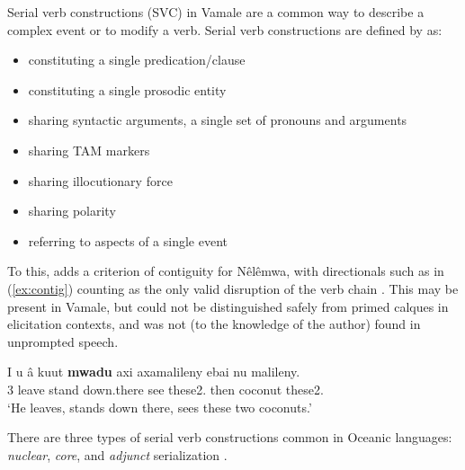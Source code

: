 
Serial verb constructions (SVC) in Vamale are a common way to describe a complex event or to modify a verb. Serial verb constructions are defined by \textcite[169]{bril_complex_2004} as:
\begin{itemize}
	\item constituting a single predication/clause
	\item constituting a single prosodic entity
	\item sharing syntactic arguments, a single set of pronouns and arguments
	\item sharing TAM markers
	\item sharing illocutionary force
	\item sharing polarity
	\item referring to aspects of a single event
\end{itemize}
To this, \citeauthor{bril_complex_2004} adds a criterion of contiguity for Nêlêmwa, with directionals such as in (\ref{ex:contig}) counting as the only valid disruption of the verb chain \parencite[169]{bril_complex_2004}. This may be present in Vamale, but could not be distinguished safely from primed calques in elicitation contexts, and was not (to the knowledge of the author) found in unprompted speech. %

\ea
\label{ex:contig}
\gll I u â kuut \textbf{mwadu} axi axamalileny ebai nu malileny.\\ 
 3  leave stand down.there see these2. then coconut these2.\\ 
\glt ‘He leaves, stands down there, sees these two coconuts.’
%
%
% 
%
%
%
\z

\noindent There are three types of serial verb constructions common in Oceanic languages: \textit{nuclear}, \textit{core}, and \textit{adjunct} serialization \parencite[168]{bril_complex_2004}. 

